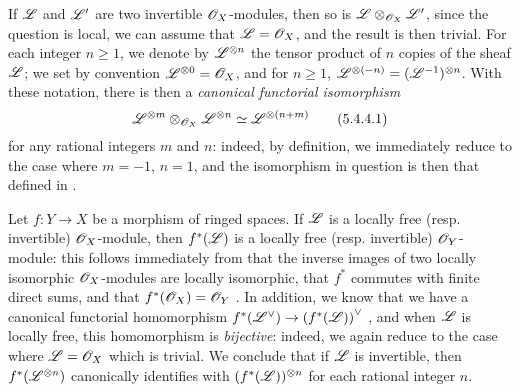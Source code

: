 \begin{env}[5.4.4]
\label{0.5.4.4}
If $\mathscr{L}$ and $\mathscr{L}'$ are two invertible $\mathscr{O}_X$-modules, then so is $\mathscr{L}\otimes_{\mathscr{O}_X}\mathscr{L}'$, since the question is local, we can assume that $\mathscr{L}=\mathscr{O}_X$, and the result is then trivial.
For each integer $n\geq 1$, we denote by $\mathscr{L}^{\otimes n}$ the tensor product of $n$ copies of the sheaf
$\mathscr{L}$; we set by convention $\mathscr{L}^{\otimes 0}=\mathscr{O}_X$, and for $n\geq 1$, $\mathscr{L}^{\otimes(-n)}=(\mathscr{L}^{-1})^{\otimes n}$.
With these notation, there is then a \emph{canonical functorial isomorphism}
\[
  \mathscr{L}^{\otimes m}\otimes_{\mathscr{O}_X}\mathscr{L}^{\otimes n}\simeq\mathscr{L}^{\otimes(n+m)}
  \tag{5.4.4.1}
\]
for any rational integers $m$ and $n$:
indeed, by definition, we immediately reduce to the case where $m=-1$, $n=1$, and the isomorphism in question is then that defined in .
\end{env}

\begin{env}[5.4.5]
\label{0.5.4.5}
Let $f:Y\to X$ be a morphism of ringed spaces.
If $\mathscr{L}$ is a locally free (resp. invertible) $\mathscr{O}_X$-module, then $f^*(\mathscr{L})$ is a locally free (resp. invertible) $\mathscr{O}_Y$-module:
this follows immediately from that the inverse images of two locally isomorphic $\mathscr{O}_X$-modules are locally isomorphic, that $f^*$ commutes with finite direct sums, and that $f^*(\mathscr{O}_X)=\mathscr{O}_Y$ .
In addition, we know that we have a canonical functorial homomorphism $f^*(\dual{\sh{L}})\to\dual{(f^*(\sh{L}))}$ , and when $\mathscr{L}$ is locally free, this homomorphism is \emph{bijective}:
indeed, we again reduce to the case where $\mathscr{L}=\mathscr{O}_X$ which is trivial.
We conclude that if $\mathscr{L}$ is invertible, then $f^*(\mathscr{L}^{\otimes n})$ canonically identifies with $(f^*(\mathscr{L}))^{\otimes n}$ for each rational integer $n$.
\end{env}


